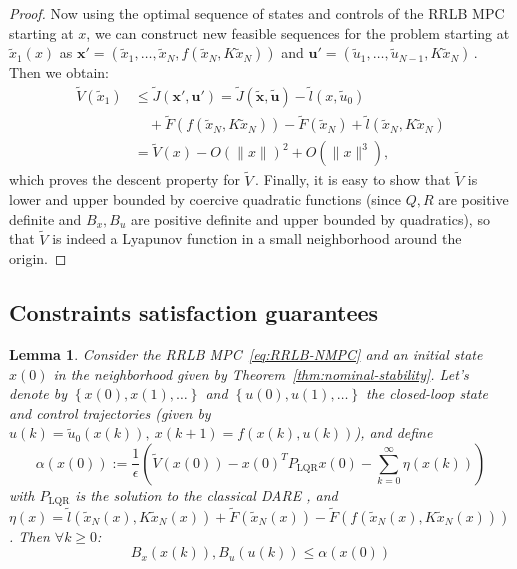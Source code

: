 \documentclass[conference]{IEEEtran}
\newtheorem{lemma}[theorem]{Lemma}
\theoremstyle{definition}
\theoremstyle{remark}
\def\rm#1{\mathrm{#1}}
\def\bf#1{\mathbf{#1}}
\begin{document}
\begin{proof}
	Now using the optimal sequence of states and controls of the RRLB MPC starting at $x$, we can construct new feasible sequences for the problem starting at $\tilde{x}_1(x)$ as
	$\bf{x}'=(\tilde{x}_1,\ldots,\tilde{x}_N,f(\tilde{x}_N,K\tilde{x}_N))$ and $\bf{u}'=(\tilde{u}_1,\ldots,\tilde{u}_{N-1},K\tilde{x}_N)$\,.
	Then we obtain:
	\begin{align*}
		\tilde{V}(\tilde{x}_1)&\leq\tilde{J}(\bf{x}',\bf{u}')=\tilde{J}(\tilde{\bf{x}},\tilde{\bf{u}})-\tilde{l}(x,\tilde{u}_0)\\
		&\quad+\tilde{F}(f(\tilde{x}_N,K\tilde{x}_N))-\tilde{F}(\tilde{x}_N)+\tilde{l}(\tilde{x}_N,K\tilde{x}_N)\\
		&=\tilde{V}(x)-O(\|x\|)^2+O(\|x\|^3),
	\end{align*}
	which proves the descent property for $\tilde{V}$\,.
	Finally, it is easy to show that $\tilde{V}$ is lower and upper bounded by coercive quadratic functions (since $Q,R$ are positive definite and $B_x,B_u$ are positive definite and upper bounded by quadratics), so that $\tilde{V}$ is indeed a Lyapunov function in a small neighborhood around the origin.
\end{proof}

\subsection{Constraints satisfaction guarantees}
\label{sec:constraints-satisfaction-guarantees}
\begin{lemma}
	\label{thm:RRLB-bounds-guarantees}
	Consider the RRLB MPC~\ref{eq:RRLB-NMPC} and an initial state $x(0)$ in the neighborhood given by Theorem~\ref{thm:nominal-stability}.
	Let's denote by $\left\{x(0),x(1),\ldots\right\}$ and $\left\{u(0), u(1),\ldots\right\}$ the closed-loop state and control trajectories (given by $u(k)=\tilde{u}_0(x(k)),~x(k+1)=f(x(k),u(k))$), and define 
	\begin{equation*}	
		\alpha(x(0)):=\frac{1}{\epsilon}\left(\tilde{V}(x(0))-x(0)^TP_{\rm{LQR}}x(0)-\sum_{k=0}^\infty\eta(x(k))\right)
	\end{equation*}
	with $P_{\rm{LQR}}$ is the solution to the classical DARE
	, and $\eta(x)=\tilde{l}(\tilde{x}_N(x),K\tilde{x}_N(x))+\tilde{F}(\tilde{x}_N(x))-\tilde{F}(f(\tilde{x}_N(x), K\tilde{x}_N(x)))$.
	Then $\forall k\geq 0$:
	\begin{equation*}
		B_x(x(k)),B_u(u(k))\leq\alpha(x(0))
	\end{equation*}
\end{lemma}
\end{document}
